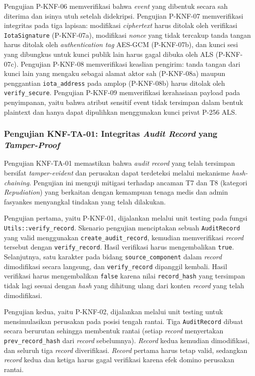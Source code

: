 Pengujian P-KNF-06 memverifikasi bahwa \textit{event} yang dibentuk secara sah
diterima dan isinya utuh setelah didekripsi. Pengujian P-KNF-07 memverifikasi
integritas pada tiga lapisan: modifikasi \textit{ciphertext} harus ditolak oleh
verifikasi \texttt{IotaSignature} (P-KNF-07a), modifikasi \textit{nonce} yang
tidak tercakup tanda tangan harus ditolak oleh \textit{authentication tag}
AES-GCM (P-KNF-07b), dan kunci sesi yang dibungkus untuk kunci publik lain harus
gagal dibuka oleh ALS (P-KNF-07c). Pengujian P-KNF-08 memverifikasi keaslian
pengirim: tanda tangan dari kunci lain yang mengaku sebagai alamat aktor sah
(P-KNF-08a) maupun penggantian \texttt{iota\_address} pada amplop (P-KNF-08b)
harus ditolak oleh \texttt{verify\_secure}. Pengujian P-KNF-09 memverifikasi kerahasiaan payload pada penyimpanan, yaitu bahwa atribut sensitif event tidak tersimpan dalam bentuk plaintext dan hanya dapat dipulihkan menggunakan kunci privat P-256 ALS.

\subsubsection{Pengujian KNF-TA-01: Integritas \textit{Audit Record} yang \textit{Tamper-Proof}}

Pengujian KNF-TA-01 memastikan bahwa \textit{audit record} yang telah tersimpan bersifat \textit{tamper-evident} dan perusakan dapat terdeteksi melalui mekanisme \textit{hash-chaining}. Pengujian ini menguji mitigasi terhadap ancaman T7 dan T8 (kategori \textit{Repudiation}) yang berkaitan dengan kemampuan tenaga medis dan admin fasyankes menyangkal tindakan yang telah dilakukan.

Pengujian pertama, yaitu P-KNF-01, dijalankan melalui unit testing pada fungsi \texttt{Utils::verify\_record}. Skenario pengujian menciptakan sebuah \texttt{AuditRecord} yang valid menggunakan \texttt{create\_audit\_record}, kemudian memverifikasi \textit{record} tersebut dengan \texttt{verify\_record}. Hasil verifikasi harus mengembalikan \texttt{true}. Selanjutnya, satu karakter pada bidang \texttt{source\_component} dalam \textit{record} dimodifikasi secara langsung, dan \texttt{verify\_record} dipanggil kembali. Hasil verifikasi harus mengembalikan \texttt{false} karena nilai \texttt{record\_hash} yang tersimpan tidak lagi sesuai dengan \textit{hash} yang dihitung ulang dari konten \textit{record} yang telah dimodifikasi.

Pengujian kedua, yaitu P-KNF-02, dijalankan melalui unit testing untuk mensimulasikan perusakan pada posisi tengah rantai. Tiga \texttt{AuditRecord} dibuat secara berurutan sehingga membentuk rantai (setiap \textit{record} menyertakan \texttt{prev\_record\_hash} dari \textit{record} sebelumnya). \textit{Record} kedua kemudian dimodifikasi, dan seluruh tiga \textit{record} diverifikasi. \textit{Record} pertama harus tetap valid, sedangkan \textit{record} kedua dan ketiga harus gagal verifikasi karena efek domino perusakan rantai.

